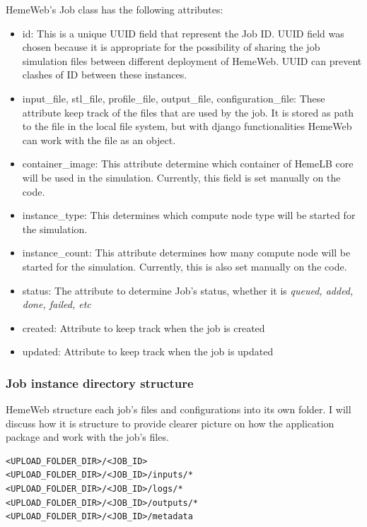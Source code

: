 HemeWeb's Job class has the following attributes:
\begin{itemize}
    \item id:  This is a unique UUID field that represent the Job ID. UUID field was chosen because it is appropriate for the possibility of sharing the job simulation files between different deployment of HemeWeb. UUID can prevent clashes of ID between these instances.
    \item input\_file, stl\_file, profile\_file, output\_file, configuration\_file:  These attribute keep track of the files that are used by the job. It is stored as path to the file in the local file system, but with django functionalities HemeWeb can work with the file as an object.
    \item container\_image:  This attribute determine which container of HemeLB core will be used in the simulation. Currently, this field is set manually on the code. 
    \item instance\_type: This determines which compute node type will be started for the simulation. 
    \item instance\_count: This attribute determines how many compute node will be started for the simulation. Currently, this is also set manually on the code. 
    \item status: The attribute to determine Job's status, whether it is \textit{queued, added, done, failed, etc}
    \item created: Attribute to keep track when the job is created
    \item updated: Attribute to keep track when the job is updated 
\end{itemize}





\subsubsection{Job instance directory structure}

HemeWeb structure each job's files and configurations into its own folder. I will discuss how it is structure to provide clearer picture on how the application package and work with the job's files.

\begin{lstlisting}
<UPLOAD_FOLDER_DIR>/<JOB_ID>
<UPLOAD_FOLDER_DIR>/<JOB_ID>/inputs/*
<UPLOAD_FOLDER_DIR>/<JOB_ID>/logs/*
<UPLOAD_FOLDER_DIR>/<JOB_ID>/outputs/*
<UPLOAD_FOLDER_DIR>/<JOB_ID>/metadata
\end{lstlisting}

